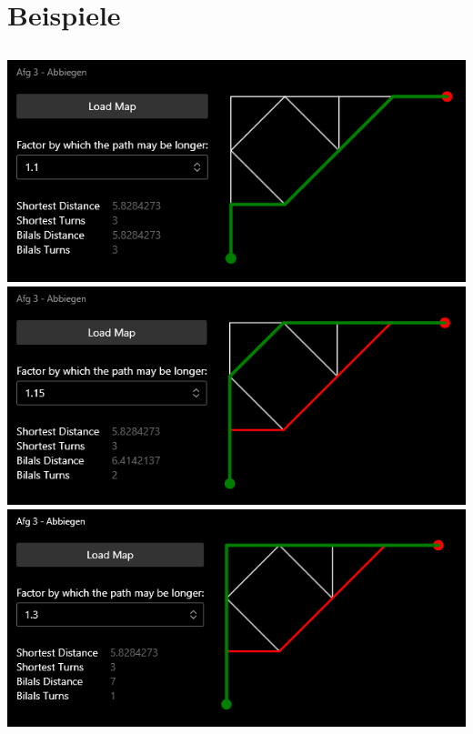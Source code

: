 \documentclass{article}
\theoremstyle{nonumberplain}
\begin{document}
\section{Beispiele}

\newcommand{\incgra}[1]{
    \begin{center}
        \makebox[\textwidth]{\texttt{[image: \#1]}}
    \end{center}
}

\subsection{}

\begin{center}
\includegraphics[width=\textwidth]{examples/0_10.png}
\includegraphics[width=\textwidth]{examples/0_15.png}
\includegraphics[width=\textwidth]{examples/0_30.png}
\end{center}
\end{document}
